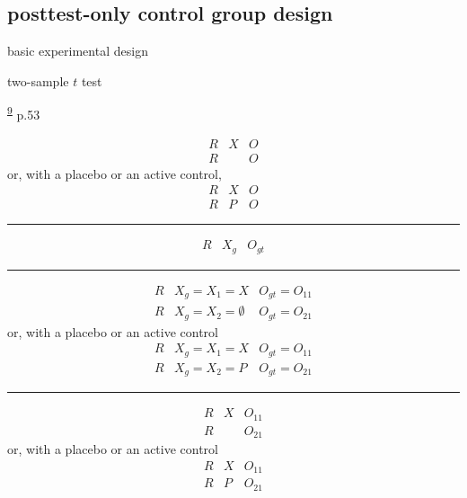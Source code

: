 \documentclass[
]{book}
\theoremstyle{definition}
\theoremstyle{definition}
\theoremstyle{definition}
\theoremstyle{definition}
\theoremstyle{remark}
\begin{document}
\hypertarget{posttest-only-control-group-design}{%
\subsection{posttest-only control group design}\label{posttest-only-control-group-design}}

basic experimental design

two-sample \(t\) test

\textsuperscript{\protect\hyperlink{ref-hu2022}{9}} p.53

\[
\begin{array}{ccc}
R & X & O\\
R &  & O
\end{array}
\]
or, with a placebo or an active control,
\[
\begin{array}{ccc}
R & X & O\\
R & P & O
\end{array}
\]

\begin{center}\rule{0.5\linewidth}{0.5pt}\end{center}

\[
\begin{array}{ccc}
R & X_{g} & O_{gt}\end{array}
\]

\begin{center}\rule{0.5\linewidth}{0.5pt}\end{center}

\[
\begin{array}{ccc}
R & X_{g}=X_{1}=X & O_{gt}=O_{11}\\
R & X_{g}=X_{2}=\emptyset & O_{gt}=O_{21}
\end{array}
\]
or, with a placebo or an active control
\[
\begin{array}{ccc}
R & X_{g}=X_{1}=X & O_{gt}=O_{11}\\
R & X_{g}=X_{2}=P & O_{gt}=O_{21}
\end{array}
\]

\begin{center}\rule{0.5\linewidth}{0.5pt}\end{center}

\[
\begin{array}{ccc}
R & X & O_{11}\\
R &  & O_{21}
\end{array}
\]
or, with a placebo or an active control
\[
\begin{array}{ccc}
R & X & O_{11}\\
R & P & O_{21}
\end{array}
\]
\end{document}
